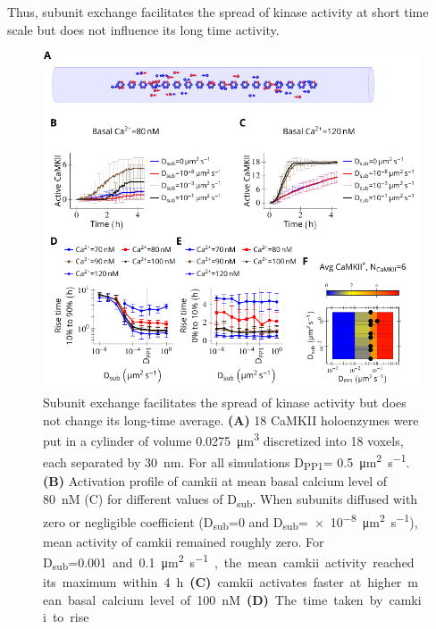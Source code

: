 \documentclass[9pt,lineno,doublespacing]{elife}
\newcommand\SUB[2]{#1\textsubscript{#2}}
\begin{document}
Thus, subunit exchange facilitates the spread of kinase activity at short time
scale but does not influence its long time activity.

\begin{figure}
    \includegraphics[width=0.95\linewidth]{./PaperFigures/elifeFigure4/figure_camkii_activation_130mm.pdf}
    \caption{Subunit exchange facilitates the spread of kinase activity
        \citep{stratton_activation-triggered_2014} but does not change its
        long-time average. \textbf{(A)} 18 CaMKII holoenzymes were put in a
        cylinder of volume \SI{0.0275}{\cubic\micro\meter} discretized into 18
        voxels, each separated by \SI{30}{\nano\meter}. For all simulations
        \SUB{D}{PP1}= \SI{0.5}{\micro\meter\squared\per\second}. \textbf{(B)}
        Activation profile of \gls{camkii} at mean basal calcium level of
        \SI{80}{\nano M} (C) for different values of
        \SUB{D}{sub}. When subunits diffused
        with zero or negligible coefficient (\SUB{D}{sub}=0 and
        \SUB{D}{sub}=\SI{e-8}{\micro\meter\squared\per\second}), mean activity
        of \gls{camkii} remained roughly zero. For \SUB{D}{sub}=\SI{0.001} and
        \SI{0.1}{\micro\meter\squared\per\second}, the mean \gls{camkii}
        activity reached its maximum within \SI{4}{\hour}.  \textbf{(C)}
        \gls{camkii} activates faster at higher mean basal calcium level of
        \SI{100}{\nano M}. \textbf{(D)} The time taken by \gls{camkii} to rise
}
\end{figure}
\end{document}
